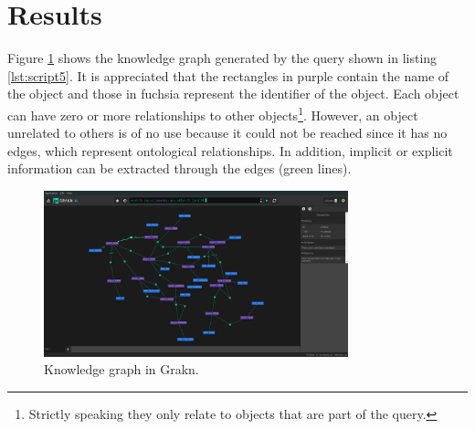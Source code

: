 \section{Results}
\label{sec:results}
Figure \ref{fig:grafGra} shows the knowledge graph generated by the query shown in listing \ref{lst:script5}. It is appreciated that the rectangles in purple contain the name of the object and those in fuchsia represent the identifier of the object. Each object can have zero or more relationships to other objects\footnote{Strictly speaking they only relate to objects that are part of the query.}. However, an object unrelated to others is of no use because it could not be reached since it has no edges, which represent ontological relationships. In addition, implicit or explicit information can be extracted through the edges (green lines).



\begin{figure}[H]
    \centering
    \includegraphics[width=8.8cm]{figures/allrel.png}
    \caption{Knowledge graph in Grakn.}
    \label{fig:grafGra}
\end{figure}

